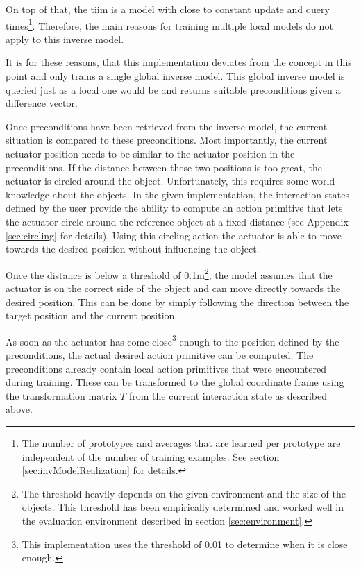 On top of that, the \gls{tiim} is a model with close to constant update and query times\footnote{The number of prototypes and averages that are learned per prototype are independent of the number of training examples. See section \ref{sec:invModelRealization} for details.}. Therefore, the main reasons for training multiple local models do not apply to this inverse model.

It is for these reasons, that this implementation deviates from the concept in this point and only trains a single global inverse model.
This global inverse model is queried just as a local one would be and returns suitable preconditions given a difference vector.

Once preconditions have been retrieved from the inverse model, the current situation is compared to these preconditions. Most importantly, the current actuator position needs to be similar to the actuator position in the preconditions. If the distance between these two positions is too great, the actuator is circled around the object. Unfortunately, this requires some world knowledge about the objects. In the given implementation, the interaction states defined by the user provide the ability to compute an action primitive that lets the actuator circle around the reference object at a fixed distance (see Appendix \ref{sec:circling} for details). 
Using this circling action the actuator is able to move towards the desired position without influencing the object.

Once the distance is below a threshold of 0.1m\footnote{The threshold heavily depends on the given environment and the size of the objects. This threshold has been empirically determined and worked well in the evaluation environment described in section \ref{sec:environment}.}, the model assumes that the actuator is on the correct side of the object and can move directly towards the desired position. This can be done by simply following the direction between the target position and the current position.

As soon as the actuator has come close\footnote{This implementation uses the threshold of 0.01 to determine when it is close enough.} enough to the position defined by the preconditions, the actual desired action primitive can be computed. The preconditions already contain local action primitives that were encountered during training. These can be transformed to the global coordinate frame using the transformation matrix $T$ from the current interaction state as described above. 

